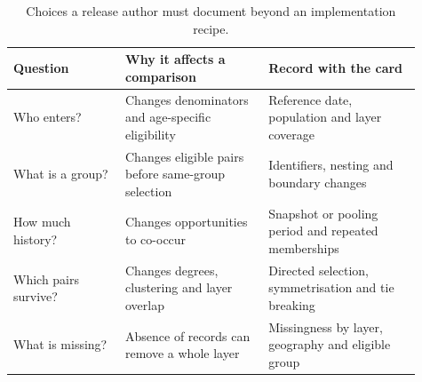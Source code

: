 \begin{table}[!htbp]
\centering\small
\caption{Choices a release author must document beyond an implementation recipe.}
\label{tab:limits}
\begin{tabular}{@{} >{\raggedright\arraybackslash}p{0.25\linewidth} >{\raggedright\arraybackslash}p{0.32\linewidth} >{\raggedright\arraybackslash}p{0.34\linewidth} @{}}
\toprule
\rowcolor{tableblue} \textbf{Question} & \textbf{Why it affects a comparison} & \textbf{Record with the card} \\
\midrule
Who enters? & Changes denominators and age-specific eligibility & Reference date, population and layer coverage \\
What is a group? & Changes eligible pairs before same-group selection & Identifiers, nesting and boundary changes \\
How much history? & Changes opportunities to co-occur & Snapshot or pooling period and repeated memberships \\
Which pairs survive? & Changes degrees, clustering and layer overlap & Directed selection, symmetrisation and tie breaking \\
What is missing? & Absence of records can remove a whole layer & Missingness by layer, geography and eligible group \\
\bottomrule
\end{tabular}
\end{table}
